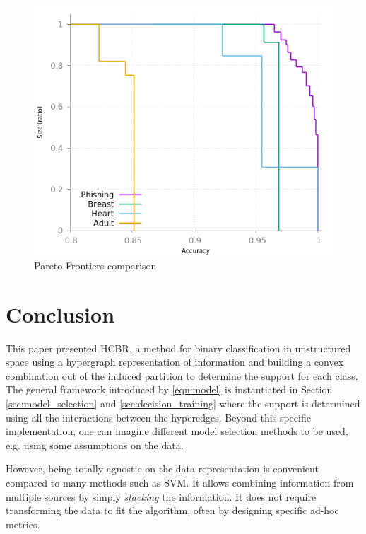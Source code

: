 \documentclass[preprint,12pt]{elsarticle}
\def\HCBR{{\sc HCBR}}
\theoremstyle{definition}
\begin{document}
\begin{figure}[!h]\centering
\includegraphics[scale=0.3]{img/meta_pareto_all_front.png}
\caption{Pareto Frontiers comparison.}
\label{fig:meta_all}
\end{figure}

\section{Conclusion}
\label{sec:conclusion}

This paper presented \HCBR, a method for binary classification in unstructured space using a hypergraph representation of information and building a convex combination out of the induced partition to determine the support for each class. The general framework introduced by \eqref{eqn:model} is instantiated in Section \ref{sec:model_selection} and \ref{sec:decision_training} where the support is determined using all the interactions between the hyperedges. Beyond this specific implementation, one can imagine different model selection methods to be used, e.g. using some assumptions on the data.

However, being totally agnostic on the data representation is convenient compared to many methods such as SVM. It allows combining information from multiple sources by simply {\it stacking} the information. It does not require transforming the data to fit the algorithm, often by designing specific ad-hoc metrics.
\end{document}
